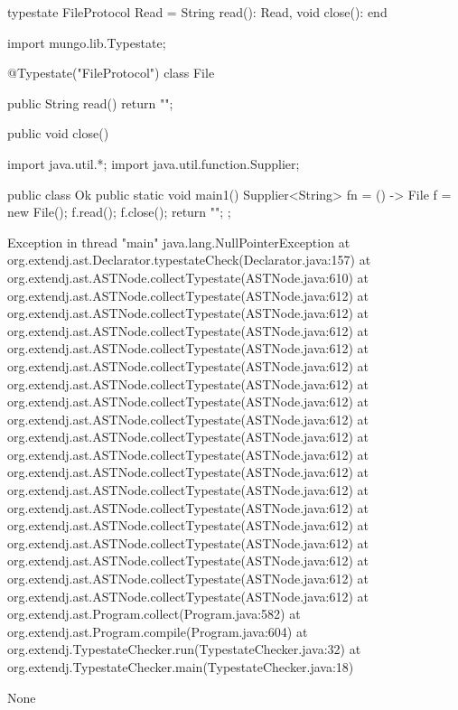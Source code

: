 \begin{code}
typestate FileProtocol {
  Read = {
    String read(): Read,
    void close(): end
  }
}\end{code}

\begin{code}
import mungo.lib.Typestate;

@Typestate("FileProtocol")
class File {

  public String read() {
    return "";
  }

  public void close() {
  }

}\end{code}

\begin{code}
import java.util.*;
import java.util.function.Supplier;

public class Ok {
  public static void main1() {
    Supplier<String> fn = () -> {
      File f = new File();
      f.read();
      f.close();
      return "";
    };
  }
}\end{code}

\lstset{caption=Original Mungo output}
\begin{code}
Exception in thread "main" java.lang.NullPointerException
	at org.extendj.ast.Declarator.typestateCheck(Declarator.java:157)
	at org.extendj.ast.ASTNode.collectTypestate(ASTNode.java:610)
	at org.extendj.ast.ASTNode.collectTypestate(ASTNode.java:612)
	at org.extendj.ast.ASTNode.collectTypestate(ASTNode.java:612)
	at org.extendj.ast.ASTNode.collectTypestate(ASTNode.java:612)
	at org.extendj.ast.ASTNode.collectTypestate(ASTNode.java:612)
	at org.extendj.ast.ASTNode.collectTypestate(ASTNode.java:612)
	at org.extendj.ast.ASTNode.collectTypestate(ASTNode.java:612)
	at org.extendj.ast.ASTNode.collectTypestate(ASTNode.java:612)
	at org.extendj.ast.ASTNode.collectTypestate(ASTNode.java:612)
	at org.extendj.ast.ASTNode.collectTypestate(ASTNode.java:612)
	at org.extendj.ast.ASTNode.collectTypestate(ASTNode.java:612)
	at org.extendj.ast.ASTNode.collectTypestate(ASTNode.java:612)
	at org.extendj.ast.ASTNode.collectTypestate(ASTNode.java:612)
	at org.extendj.ast.ASTNode.collectTypestate(ASTNode.java:612)
	at org.extendj.ast.ASTNode.collectTypestate(ASTNode.java:612)
	at org.extendj.ast.ASTNode.collectTypestate(ASTNode.java:612)
	at org.extendj.ast.ASTNode.collectTypestate(ASTNode.java:612)
	at org.extendj.ast.ASTNode.collectTypestate(ASTNode.java:612)
	at org.extendj.ast.ASTNode.collectTypestate(ASTNode.java:612)
	at org.extendj.ast.Program.collect(Program.java:582)
	at org.extendj.ast.Program.compile(Program.java:604)
	at org.extendj.TypestateChecker.run(TypestateChecker.java:32)
	at org.extendj.TypestateChecker.main(TypestateChecker.java:18)
\end{code}

\lstset{caption=New Mungo output}
\begin{code}
None
\end{code}

